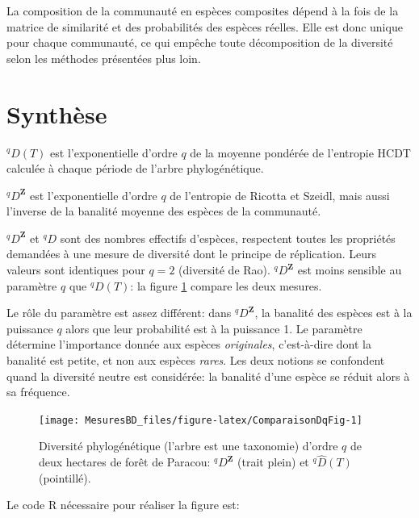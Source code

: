 \documentclass[
  11pt,
  french,
  a4paper,
  extrafontsizes,onecolumn,openright
  ]{memoir}
\begin{document}
La composition de la communauté en espèces composites dépend à la fois de la matrice de similarité et des probabilités des espèces réelles.
Elle est donc unique pour chaque communauté, ce qui empêche toute décomposition de la diversité selon les méthodes présentées plus loin.

\section{Synthèse}\label{sec-dqzSynthese}

\(^{q}\!D(T)\) est l'exponentielle d'ordre \(q\) de la moyenne pondérée de l'entropie HCDT calculée à chaque période de l'arbre phylogénétique.

\(^q\!D^{\mathbf{Z}}\) est l'exponentielle d'ordre \(q\) de l'entropie de Ricotta et Szeidl, mais aussi l'inverse de la banalité moyenne des espèces de la communauté.

\(^q\!D^{\mathbf{Z}}\) et \(^{q}\!D\) sont des nombres effectifs d'espèces, respectent toutes les propriétés demandées à une mesure de diversité dont le principe de réplication.
Leurs valeurs sont identiques pour \(q=2\) (diversité de Rao).
\(^q\!D^{\mathbf{Z}}\) est moins sensible au paramètre \(q\) que \(^{q}\!D(T)\): la figure \ref{fig:ComparaisonDqFig} compare les deux mesures.

Le rôle du paramètre est assez différent: dans \(^q\!D^{\mathbf{Z}}\), la banalité des espèces est à la puissance \(q\) alors que leur probabilité est à la puissance 1.
Le paramètre détermine l'importance donnée aux espèces \emph{originales}, c'est-à-dire dont la banalité est petite, et non aux espèces \emph{rares}.
Les deux notions se confondent quand la diversité neutre est considérée: la banalité d'une espèce se réduit alors à sa fréquence.



\scriptsize

\begin{figure}

{\centering \texttt{[image: MesuresBD\_files/figure-latex/ComparaisonDqFig-1]} 

}

\caption{Diversité phylogénétique (l'arbre est une taxonomie) d'ordre \(q\) de deux hectares de forêt de Paracou: \(^q\!D^{\mathbf{Z}}\) (trait plein) et \(^{q}\!\hat{D}(T)\) (pointillé).}\label{fig:ComparaisonDqFig}
\end{figure}

\normalsize

Le code R nécessaire pour réaliser la figure est:
\end{document}
